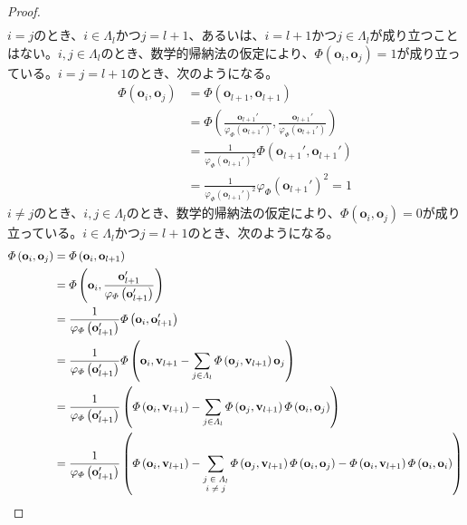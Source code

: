 \documentclass[dvipdfmx]{jsarticle}
\begin{document}
\begin{proof}
\begin{align*}
\end{align*}
$i = j$のとき、$i \in \varLambda_{l}$かつ$j = l + 1$、あるいは、$i = l + 1$かつ$j \in \varLambda_{l}$が成り立つことはない。$i,j \in \varLambda_{l}$のとき、数学的帰納法の仮定により、$\varPhi\left( \mathbf{o}_{i},\mathbf{o}_{j} \right) = 1$が成り立っている。$i = j = l + 1$のとき、次のようになる。
\begin{align*}
\varPhi\left( \mathbf{o}_{i},\mathbf{o}_{j} \right) &= \varPhi\left( \mathbf{o}_{l + 1},\mathbf{o}_{l + 1} \right)\\
&= \varPhi\left( \frac{\mathbf{o}_{l + 1}'}{\varphi_{\varPhi}\left( \mathbf{o}_{l + 1}' \right)},\frac{\mathbf{o}_{l + 1}'}{\varphi_{\varPhi}\left( \mathbf{o}_{l + 1}' \right)} \right)\\
&= \frac{1}{{\varphi_{\varPhi}\left( \mathbf{o}_{l + 1}' \right)}^{2}}\varPhi\left( \mathbf{o}_{l + 1}',\mathbf{o}_{l + 1}' \right)\\
&= \frac{1}{{\varphi_{\varPhi}\left( \mathbf{o}_{l + 1}' \right)}^{2}}{\varphi_{\varPhi}\left( \mathbf{o}_{l + 1}' \right)}^{2} = 1
\end{align*}
$i \neq j$のとき、$i,j \in \varLambda_{l}$のとき、数学的帰納法の仮定により、$\varPhi\left( \mathbf{o}_{i},\mathbf{o}_{j} \right) = 0$が成り立っている。$i \in \varLambda_{l}$かつ$j = l + 1$のとき、次のようになる。
\begin{align*}
\varPhi\left( \mathbf{o}_{i},\mathbf{o}_{j} \right) &= \varPhi\left( \mathbf{o}_{i},\mathbf{o}_{l + 1} \right)\\
&= \varPhi\left( \mathbf{o}_{i},\frac{\mathbf{o}_{l + 1}'}{\varphi_{\varPhi}\left( \mathbf{o}_{l + 1}' \right)} \right)\\
&= \frac{1}{\varphi_{\varPhi}\left( \mathbf{o}_{l + 1}' \right)}\varPhi\left( \mathbf{o}_{i},\mathbf{o}_{l + 1}' \right)\\
&= \frac{1}{\varphi_{\varPhi}\left( \mathbf{o}_{l + 1}' \right)}\varPhi\left( \mathbf{o}_{i},\mathbf{v}_{l + 1} - \sum_{j \in \varLambda_{l}} {\varPhi\left( \mathbf{o}_{j},\mathbf{v}_{l + 1} \right)\mathbf{o}_{j}} \right)\\
&= \frac{1}{\varphi_{\varPhi}\left( \mathbf{o}_{l + 1}' \right)}\left( \varPhi\left( \mathbf{o}_{i},\mathbf{v}_{l + 1} \right) - \sum_{j \in \varLambda_{l}} {\varPhi\left( \mathbf{o}_{j},\mathbf{v}_{l + 1} \right)\varPhi\left( \mathbf{o}_{i},\mathbf{o}_{j} \right)} \right)\\
&= \frac{1}{\varphi_{\varPhi}\left( \mathbf{o}_{l + 1}' \right)}\left( \varPhi\left( \mathbf{o}_{i},\mathbf{v}_{l + 1} \right) - \sum_{\scriptsize \begin{matrix} j \in \varLambda_{l}\\i \neq j\\\end{matrix}} {\varPhi\left( \mathbf{o}_{j},\mathbf{v}_{l + 1} \right)\varPhi\left( \mathbf{o}_{i},\mathbf{o}_{j} \right)} - \varPhi\left( \mathbf{o}_{i},\mathbf{v}_{l + 1} \right)\varPhi\left( \mathbf{o}_{i},\mathbf{o}_{i} \right) \right)\\

\end{align*}
\end{proof}
\end{document}
